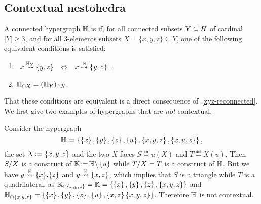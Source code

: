
\subsection{Contextual nestohedra}

\begin{definition} 
A connected hypergraph ${\mathbb H}$ is  if, for all connected subsets $Y\subseteq H$ of cardinal $|Y|\geq 3$, and for all $3$-elements subsets $X=\{x,y,z\} \subseteq Y$, one of the following equivalent conditions is satisfied:
\begin{enumerate}
\item
$\begin{array}{lll}
  x\stackrel{{{\mathbb H}_Y}}{\rightsquigarrow}\left\{y,z\right\} & \Leftrightarrow & x\stackrel{{\mathbb H}}{\rightsquigarrow}\left\{y,z\right\}
  \end{array}$,
\item
${\mathbb H}_{\cap X} = ({\mathbb H}_Y)_{\cap X}$.
\end{enumerate}
\end{definition}
That these conditions are equivalent   is a direct consequence of~\cref{xyz-reconnected}.
We first give two examples of hypergraphs that are \emph{not} contextual.


\begin{example} 
  \label{non-contextual-1}
Consider the hypergraph 
\[
  \hyper{H}\eqdef  \set{\set{x},\set{y},\set{z},\set{u},\set{x,y,z}, \set{x,u,z}},
  \]
the set $X\eqdef \set{x,y,z}$ and the two $X$-faces $S\eqdef u(X)$ and $T\eqdef X(u)$. 
Then $S/X$ is a construct of $\hyper{K}\eqdef \restrH{H}{\set{u}}$ while $T/X=T$ is a construct of ${\mathbb H}$.
But we have $y\stackrel{{\mathbb K}}{\rightsquigarrow}\left\{x\right\}\!,\!\left\{z\right\}$ and $y\stackrel{{\mathbb H}}{\rightsquigarrow}\left\{x,z\right\}$, which implies that $S$ is a triangle while $T$ is a quadrilateral, as
${\mathbb K}_{\cap \left\{x,y,z\right\}} = {\mathbb K}  =  \left\{\left\{x\right\},\left\{y\right\},\left\{z\right\},\left\{x,y,z\right\}\right\}$ and ${\mathbb H}_{\cap \left\{x,y,z\right\}}  =  \left\{\left\{x\right\},\left\{y\right\},\left\{z\right\},\left\{u\right\},\left\{x,z\right\}\left\{x,y,z\right\}\right\}$. Therefore ${\mathbb H}$ is not contextual.
\end{example}
  
